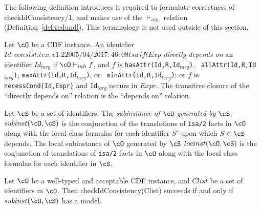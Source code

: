 The following definition introduces is required to formulate
correctness of {\sf checkIdConsistency/1}, and makes use of the
$\vdash_{inh}$ relation (Definition~\ref{def:redund}).  This
terminology is not used outside of this section.
\begin{definition}
 Let $\cO$ be a CDF instance.  An identifier $Id: consist.tex,v 1.2 2005/04/20 17:46:08 tswift Exp $ {\em directly
 depends on} an identifier $Id_{targ}$ if $\cO \vdash_{inh} f$, and
 $f$ is {\tt hasAttr(Id,R,Id$_{targ}$)}, {\tt
 allAttr(Id,R,Id$_{targ}$)}, {\tt maxAttr(Id,R,Id$_{targ}$)}, or {\tt
 minAttr(Id,R,Id$_{targ}$)}; or $f$ is {\tt necessCond(Id,Expr)} and
 {\tt Id$_{targ}$} occurs in $Expr$.  The transitive closure of the
 ``directly depends on'' relation is the ``depends on'' relation.

Let $\cS$ be a set of identifiers.  The {\em subinstance of $\cO$
generated by $\cS$}, $subinst(\cO,\cS)$ is the conjunction of the
translations of {\tt isa/2} facts in $\cO$ along with the local class
formulas for each identifier $S'$ upon which $S \in \cS$ depends.  The
local subinstance of $\cO$ generated by $\cS$ $locinst(\cO,\cS)$ is
the conjunction of translations of {\tt isa/2} facts in $\cO$ along
with the local class formulas for each identifier in $\cS$.
\end{definition}

\begin{theorem} \label{thm:type1consist}
Let $\cO$ be a well-typed and acceptable CDF instance, and $Clist$ be
a set of identifiers in $\cO$.  Then {\sf checkIdConsistency(Clist)}
succeeds if and only if $subinst(\cO,\cS)$ has a model.
\end{theorem}

